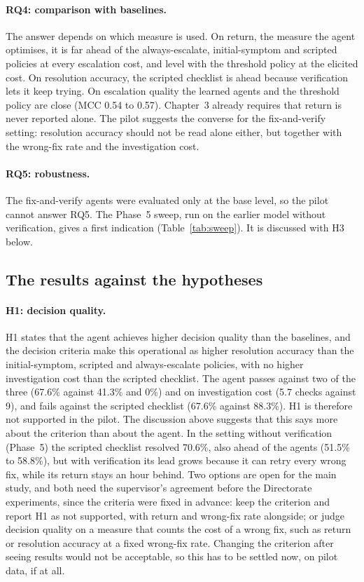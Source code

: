 \documentclass[11pt,a4paper]{article}
\begin{document}
\paragraph{RQ4: comparison with baselines.} The answer depends on which measure is used. On return, the measure the agent optimises, it is far ahead of the always-escalate, initial-symptom and scripted policies at every escalation cost, and level with the threshold policy at the elicited cost. On resolution accuracy, the scripted checklist is ahead because verification lets it keep trying. On escalation quality the learned agents and the threshold policy are close (MCC 0.54 to 0.57). Chapter~3 already requires that return is never reported alone. The pilot suggests the converse for the fix-and-verify setting: resolution accuracy should not be read alone either, but together with the wrong-fix rate and the investigation cost.

\paragraph{RQ5: robustness.} The fix-and-verify agents were evaluated only at the base level, so the pilot cannot answer RQ5. The Phase~5 sweep, run on the earlier model without verification, gives a first indication (Table~\ref{tab:sweep}). It is discussed with H3 below.

\subsection{The results against the hypotheses}\label{sec:disc-hyp}

\paragraph{H1: decision quality.} H1 states that the agent achieves higher decision quality than the baselines, and the decision criteria make this operational as higher resolution accuracy than the initial-symptom, scripted and always-escalate policies, with no higher investigation cost than the scripted checklist. The agent passes against two of the three (67.6\% against 41.3\% and 0\%) and on investigation cost (5.7 checks against 9), and fails against the scripted checklist (67.6\% against 88.3\%). H1 is therefore not supported in the pilot. The discussion above suggests that this says more about the criterion than about the agent. In the setting without verification (Phase~5) the scripted checklist resolved 70.6\%, also ahead of the agents (51.5\% to 58.8\%), but with verification its lead grows because it can retry every wrong fix, while its return stays an hour behind. Two options are open for the main study, and both need the supervisor's agreement before the Directorate experiments, since the criteria were fixed in advance: keep the criterion and report H1 as not supported, with return and wrong-fix rate alongside; or judge decision quality on a measure that counts the cost of a wrong fix, such as return or resolution accuracy at a fixed wrong-fix rate. Changing the criterion after seeing results would not be acceptable, so this has to be settled now, on pilot data, if at all.
\end{document}
